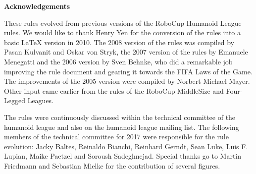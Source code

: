 \bigskip

{\bfseries Acknowledgements}

\headlinebox

These rules evolved from previous versions of the RoboCup Humanoid League rules. We would like to thank Henry Yen for the conversion of the rules into a basic LaTeX version in 2010. The 2008 version of the rules was compiled by Pasan Kulvanit and Oskar von Stryk, the 2007 version of the rules by Emanuele Menegatti and the 2006 version by Sven Behnke, who did a remarkable job improving the rule document and gearing it towards the FIFA Laws of the Game. The improvements of the 2005 version were compiled by Norbert Michael Mayer. Other input came earlier from the rules of the RoboCup MiddleSize and Four-Legged Leagues.

The rules were continuously discussed within the technical committee of the humanoid league and also on the humanoid league mailing list. The following members of the technical committee for 2017 were responsible for the rule evolution: Jacky Baltes, Reinaldo Bianchi, Reinhard Gerndt, Sean Luke, Luis F. Lupian, Maike Paetzel and Soroush Sadeghnejad. Special thanks go to Martin Friedmann and Sebastian Mielke for the contribution of several figures.
